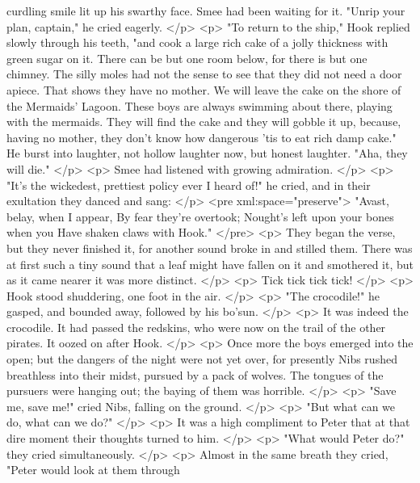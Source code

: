       curdling smile lit up his swarthy face. Smee had been waiting for it.
      "Unrip your plan, captain," he cried eagerly.
    </p>
    <p>
      "To return to the ship," Hook replied slowly through his teeth, "and cook
      a large rich cake of a jolly thickness with green sugar on it. There can
      be but one room below, for there is but one chimney. The silly moles had
      not the sense to see that they did not need a door apiece. That shows they
      have no mother. We will leave the cake on the shore of the Mermaids'
      Lagoon. These boys are always swimming about there, playing with the
      mermaids. They will find the cake and they will gobble it up, because,
      having no mother, they don't know how dangerous 'tis to eat rich damp
      cake." He burst into laughter, not hollow laughter now, but honest
      laughter. "Aha, they will die."
    </p>
    <p>
      Smee had listened with growing admiration.
    </p>
    <p>
      "It's the wickedest, prettiest policy ever I heard of!" he cried, and in
      their exultation they danced and sang:
    </p>
<pre xml:space="preserve">
     "Avast, belay, when I appear,
     By fear they're overtook;
     Nought's left upon your bones when you
     Have shaken claws with Hook."
</pre>
    <p>
      They began the verse, but they never finished it, for another sound broke
      in and stilled them. There was at first such a tiny sound that a leaf
      might have fallen on it and smothered it, but as it came nearer it was
      more distinct.
    </p>
    <p>
      Tick tick tick tick!
    </p>
    <p>
      Hook stood shuddering, one foot in the air.
    </p>
    <p>
      "The crocodile!" he gasped, and bounded away, followed by his bo'sun.
    </p>
    <p>
      It was indeed the crocodile. It had passed the redskins, who were now on
      the trail of the other pirates. It oozed on after Hook.
    </p>
    <p>
      Once more the boys emerged into the open; but the dangers of the night
      were not yet over, for presently Nibs rushed breathless into their midst,
      pursued by a pack of wolves. The tongues of the pursuers were hanging out;
      the baying of them was horrible.
    </p>
    <p>
      "Save me, save me!" cried Nibs, falling on the ground.
    </p>
    <p>
      "But what can we do, what can we do?"
    </p>
    <p>
      It was a high compliment to Peter that at that dire moment their thoughts
      turned to him.
    </p>
    <p>
      "What would Peter do?" they cried simultaneously.
    </p>
    <p>
      Almost in the same breath they cried, "Peter would look at them through
